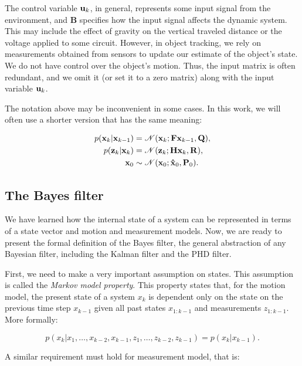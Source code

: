 The control variable $\vecat{u}{k}$, in general, represents some input signal from the environment, and $\mathbf{B}$ specifies how the input signal affects the dynamic system. This may include the effect of gravity on the vertical traveled distance or the voltage applied to some circuit. However, in object tracking, we rely on measurements obtained from sensors to update our estimate of the object's state. We do not have control over the object's motion. Thus, the input matrix is often redundant, and we omit it (or set it to a zero matrix) along with the input variable $\vecat{u}{k}$.

The notation above may be inconvenient in some cases. In this work, we will often use a shorter version that has the same meaning:

$$
\begin{aligned}
    p(\vecat{x}{k} | \vecat{x}{k-1})
        &= \mathscr{N}(\vecat{x}{k}; \mathbf{F}\vecat{x}{k-1}, \mathbf{Q}), \\
    p(\vecat{z}{k} | \vecat{x}{k})
        &= \mathscr{N}(\vecat{z}{k}; \mathbf{H}\vecat{x}{k}, \mathbf{R}), \\
    \vecat{x}{0}
        &\sim \mathscr{N}(\vecat{x}{0}; \vecat{\hat{x}}{0}, \vecat{P}{0}).
\end{aligned}
$$

\subsection{The Bayes filter}\label{sec:bayes-filter}

We have learned how the internal state of a system can be represented in terms
of a state vector and motion and measurement models. Now, we are ready to 
present the formal definition of the Bayes filter, the general abstraction of
any Bayesian filter, including the Kalman filter and the PHD filter.

First, we need to make a very important assumption on states. This assumption
is called the \textit{Markov model property}. This property states that, for 
the motion model, the present state of a system $x_k$ is dependent only on 
the state on the previous time step $x_{k-1}$ given all past states $x_{1:k-1}$ 
and measurements $z_{1:k-1}$. More formally:

$$
p(x_k | x_1, \ldots, x_{k-2}, x_{k-1},
        z_1, \ldots, z_{k-2}, z_{k-1}) 
    = p(x_k | x_{k-1}).
$$

A similar requirement must hold for measurement model, that is:

